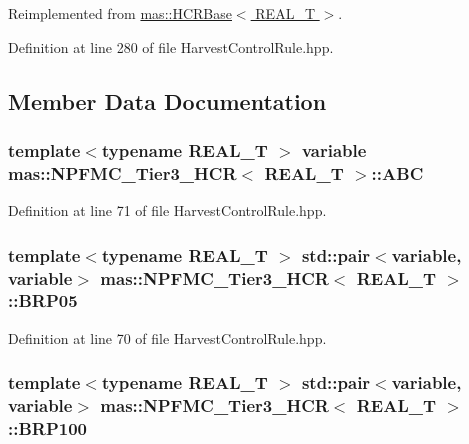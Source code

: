 Reimplemented from \hyperlink{structmas_1_1_h_c_r_base_a3f1aa4335bee8d9225776ca5212e1085}{mas\-::\-H\-C\-R\-Base$<$ R\-E\-A\-L\-\_\-\-T $>$}.



Definition at line 280 of file Harvest\-Control\-Rule.\-hpp.



\subsection{Member Data Documentation}
\hypertarget{structmas_1_1_n_p_f_m_c___tier3___h_c_r_a1360399be1b30447d5dcfbbb57318ec4}{
\subsubsection[{A\-B\-C}]{\setlength{\rightskip}{0pt plus 5cm}template$<$typename R\-E\-A\-L\-\_\-\-T $>$ {\bf variable} {\bf mas\-::\-N\-P\-F\-M\-C\-\_\-\-Tier3\-\_\-\-H\-C\-R}$<$ R\-E\-A\-L\-\_\-\-T $>$\-::A\-B\-C}}\label{structmas_1_1_n_p_f_m_c___tier3___h_c_r_a1360399be1b30447d5dcfbbb57318ec4}


Definition at line 71 of file Harvest\-Control\-Rule.\-hpp.

\hypertarget{structmas_1_1_n_p_f_m_c___tier3___h_c_r_a9885e5cfad14aa0b9ed0867998af775c}{
\subsubsection[{B\-R\-P05}]{\setlength{\rightskip}{0pt plus 5cm}template$<$typename R\-E\-A\-L\-\_\-\-T $>$ std\-::pair$<${\bf variable}, {\bf variable}$>$ {\bf mas\-::\-N\-P\-F\-M\-C\-\_\-\-Tier3\-\_\-\-H\-C\-R}$<$ R\-E\-A\-L\-\_\-\-T $>$\-::B\-R\-P05}}\label{structmas_1_1_n_p_f_m_c___tier3___h_c_r_a9885e5cfad14aa0b9ed0867998af775c}


Definition at line 70 of file Harvest\-Control\-Rule.\-hpp.

\hypertarget{structmas_1_1_n_p_f_m_c___tier3___h_c_r_a8686f8a9896d1a62e069008416bdb1c4}{
\subsubsection[{B\-R\-P100}]{\setlength{\rightskip}{0pt plus 5cm}template$<$typename R\-E\-A\-L\-\_\-\-T $>$ std\-::pair$<${\bf variable}, {\bf variable}$>$ {\bf mas\-::\-N\-P\-F\-M\-C\-\_\-\-Tier3\-\_\-\-H\-C\-R}$<$ R\-E\-A\-L\-\_\-\-T $>$\-::B\-R\-P100}}\label{structmas_1_1_n_p_f_m_c___tier3___h_c_r_a8686f8a9896d1a62e069008416bdb1c4}


